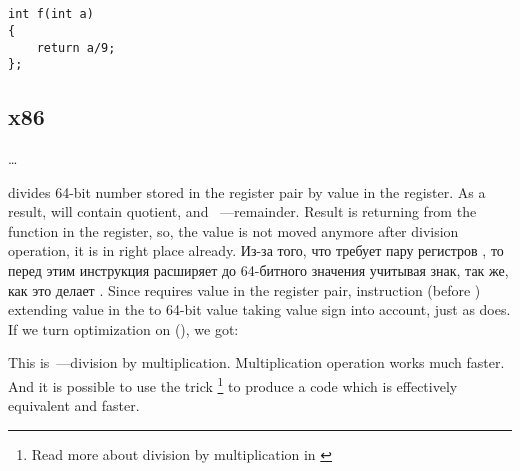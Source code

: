 \chapter{\DivisionByNineSectionName}
\label{sec:divisionbynine}


\begin{lstlisting}
int f(int a)
{
	return a/9;
};
\end{lstlisting}

\section{x86}

\dots {}



{\IDIV divides 64-bit number stored in the  register pair by value in the \ECX register.
As a result, \EAX will contain quotient\FNQUOTIENT, and \EDX~---remainder.
Result is returning from the  function in the \EAX register, 
so, the value is not moved anymore after division 
operation, it is in right place already.}
\IFRU
{Из-за того, что \IDIV требует пару регистров , то перед этим инструкция  
расширяет \EAX до 64-битного значения учитывая знак, так же, как это делает \MOVSX.}
{Since \IDIV requires value in the  register pair,  instruction (before \IDIV) extending 
value in the \EAX to 64-bit value taking value sign into account, just as \MOVSX does.}
{If we turn optimization on (\Ox), we got:}



{This is~---division by multiplication. Multiplication operation works much faster. 
And it is possible to use the trick
\footnote{Read more about division by multiplication in \cite[10-3]{Warren:2002:HD:515297}} 
to produce a code which is effectively equivalent and faster.}

